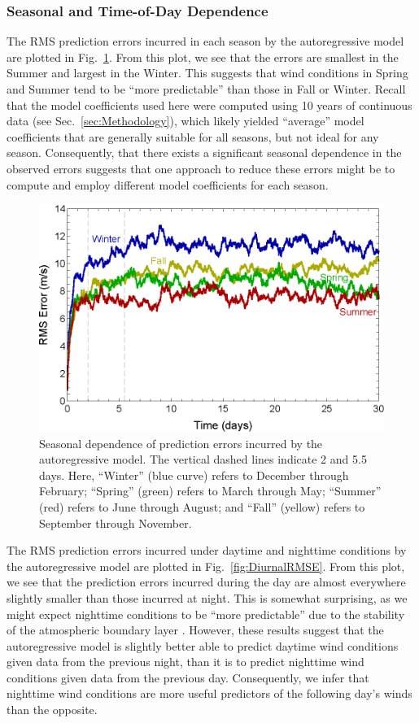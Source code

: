 \documentclass[11pt, oneside]{article}
\newcommand{\figref}[1]{Fig.~\ref{#1}}
\newcommand{\secref}[1]{Sec.~\ref{#1}}
\begin{document}
\subsubsection{Seasonal and Time-of-Day Dependence}
The RMS prediction errors incurred in each season by the autoregressive model are plotted in \figref{fig:SeasonalRMSE}.
From this plot, we see that the errors are smallest in the Summer and largest in the Winter.
This suggests that wind conditions in Spring and Summer tend to be ``more predictable'' than those in Fall or Winter.
Recall that the model coefficients used here were computed using 10 years of continuous data (see 
\secref{sec:Methodology}), which likely yielded ``average'' model coefficients that are generally suitable for all seasons, but not ideal for any season.
Consequently, that there exists a significant seasonal dependence in the observed errors suggests that one approach to reduce these errors might be to compute and employ different model coefficients for each season.

\begin{figure}[htb]
\centering
\includegraphics[width=0.7\columnwidth]{figures/SeasonalRMSPredictionError}
\caption{Seasonal dependence of prediction errors incurred by the autoregressive model.
The vertical dashed lines indicate 2 and 5.5 days.
Here, ``Winter'' (blue curve) refers to December through February;
``Spring'' (green) refers to March through May;
``Summer'' (red) refers to June through August; and
``Fall'' (yellow) refers to September through November.}
\label{fig:SeasonalRMSE}
\end{figure} %

The RMS prediction errors incurred under daytime and nighttime conditions by the autoregressive model are plotted in \figref{fig:DiurnalRMSE}.
From this plot, we see that the prediction errors incurred during the day are almost everywhere slightly smaller than those incurred at night.
This is somewhat surprising, as we might expect nighttime conditions to be ``more predictable'' due to the stability of the atmospheric boundary layer \citep[Fig.~1.7]{Stull1988}.
However, these results suggest that the autoregressive model is slightly better able to predict daytime wind conditions given data from the previous night, than it is to predict nighttime wind conditions given data from the previous day.
Consequently, we infer that nighttime wind conditions are more useful predictors of the following day's winds than the opposite.
\end{document}
